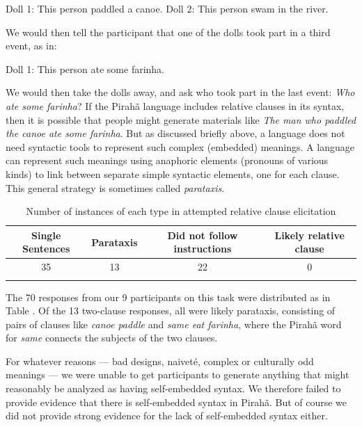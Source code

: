 \documentclass{article}
\begin{document}
\eal
\label{piraha_rcs}
\ex \label{piraha_rcs1} Doll 1: This person paddled a canoe.
\ex \label{piraha_rcs2} Doll 2: This person swam in the river.
\zl

We would then tell the participant that one of the dolls took part in a third event, as in:

\ea
\label{piraha_rcs3}
Doll 1: This person ate some farinha.
\z

We would then take the dolls away, and ask who took part in the last event: \textit{Who ate some farinha}?  If the Pirahã language includes relative clauses in its syntax, then it is possible that people might generate materials like \textit{The man who paddled the canoe ate some farinha}. But as discussed briefly above, a language does not need syntactic tools to represent such complex (embedded) meanings.  A language can represent such meanings using anaphoric elements (pronouns of various kinds) to link between separate simple syntactic elements, one for each clause.  This general strategy is sometimes called \textit{parataxis}.


\begin{table}
    \caption{Number of instances of each type in attempted relative clause elicitation}
    \label{gibson_table_1}
    \begin{tabularx}{1\textwidth}{cccc}
    \lsptoprule
         Single Sentences & Parataxis & Did not follow instructions & Likely relative clause  \\
    \midrule
         35 & 13 & 22 & 0 \\
    \lspbottomrule
    \end{tabularx}
\end{table}

The 70 responses from our 9 participants on this task were distributed as in Table .  Of the 13 two-clause responses, all were likely parataxis, consisting of pairs of clauses like \textit{canoe paddle} and \textit{same eat farinha}, where the Pirahã word for \textit{same} connects the subjects of the two clauses.

For whatever reasons — bad designs, naiveté, complex or culturally odd meanings — we were unable to get participants to generate anything that might reasonably be analyzed as having self-embedded syntax. We therefore failed to provide evidence that there is self-embedded syntax in Pirahã.  But of course we did not provide strong evidence for the lack of self-embedded syntax either.
\end{document}
